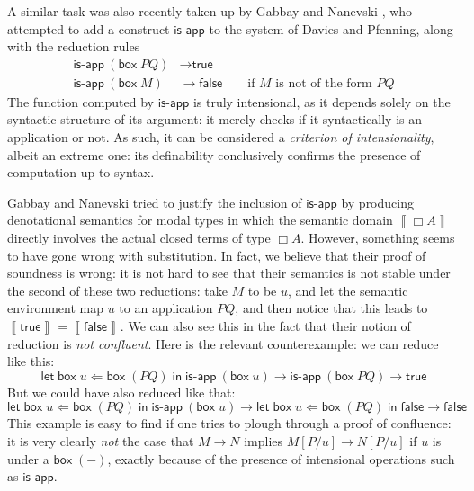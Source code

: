 \documentclass[11pt]{entcs}
\newcommand{\sem}[2]{\left\llbracket #1 \right\rrbracket^{#2}}
\newcommand{\ibox}[1]{\mathsf{box\;}#1}
\newcommand{\letbox}[3]{\mathsf{let\;box\;} #1 \Leftarrow #2 \mathsf{\;in\;} #3}
\newcommand{\red}{\mathrel{\longrightarrow}}
\begin{document}
A similar task was also recently taken up by Gabbay and Nanevski
\cite{Gabbay2013}, who attempted to add a construct
$\textsf{is-app}$ to the system of Davies and Pfenning, along with
the reduction rules \begin{align*}
  \textsf{is-app}\ (\ibox{PQ}) &\red{} \textsf{true} \\
  \textsf{is-app}\ (\ibox{M})  &\red{} \textsf{false}
    \qquad \text{if $M$ is not of the form $PQ$}
\end{align*} The function computed by $\textsf{is-app}$ is truly
intensional, as it depends solely on the syntactic structure of
its argument: it merely checks if it syntactically is an
application or not. As such, it can be considered a
\emph{criterion of intensionality}, albeit an extreme one: its
definability conclusively confirms the presence of computation up
to syntax.

Gabbay and Nanevski tried to justify the inclusion of
$\textsf{is-app}$ by producing denotational semantics for modal
types in which the semantic domain $\sem{\Box A}{}$ directly
involves the actual closed terms of type $\Box A$. However,
something seems to have gone wrong with substitution. In fact, we
believe that their proof of soundness is wrong: it is not hard to
see that their semantics is not stable under the second of these
two reductions: take $M$ to be $u$, and let the semantic
environment map $u$ to an application $PQ$, and then notice that
this leads to $\sem{\textsf{true}}{} = \sem{\textsf{false}}{}$. We
can also see this in the fact that their notion of reduction is
\emph{not confluent}. Here is the relevant counterexample: we can
reduce like this: \[
  \letbox{u}{\ibox{(PQ)}}{\textsf{is-app}\ (\ibox{u})}
    \red{}
  \textsf{is-app}\ (\ibox{PQ})
    \red{}
  \textsf{true}
\] But we could have also reduced like that: \[
  \letbox{u}{\ibox{(PQ)}}{\textsf{is-app}\ (\ibox{u})}
    \red{}
  \letbox{u}{\ibox{(PQ)}}{\textsf{false}}
    \red{}
  \textsf{false}
\] This example is easy to find if one tries to plough through a
proof of confluence: it is very clearly \emph{not} the case that
$M \red{} N$ implies $M[P/u] \red{} N[P/u]$ if $u$ is under a
$\ibox{(-)}$, exactly because of the presence of intensional
operations such as $\textsf{is-app}$.
\end{document}
